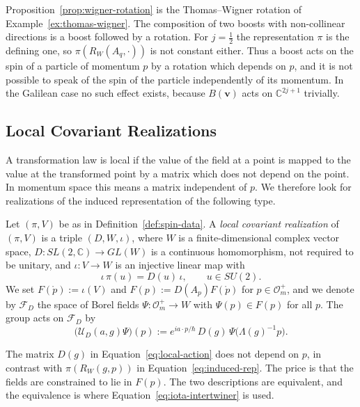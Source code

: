 	\begin{remark}
		Proposition~\ref{prop:wigner-rotation} is the Thomas--Wigner rotation of Example~\ref{ex:thomas-wigner}. The composition of two boosts with non-collinear directions is a boost followed by a rotation. For $j=\frac12$ the representation $\pi$ is the defining one, so $\pi(R_W(A_q,\cdot))$ is not constant either. Thus a boost acts on the spin of a particle of momentum $p$ by a rotation which depends on $p$, and it is not possible to speak of the spin of the particle independently of its momentum. In the Galilean case no such effect exists, because $B(\mathbf{v})$ acts on $\mathbb{C}^{2j+1}$ trivially.
	\end{remark}
	
	\subsection*{Local Covariant Realizations}
	
	A transformation law is local if the value of the field at a point is mapped to the value at the transformed point by a matrix which does not depend on the point. In momentum space this means a matrix independent of $p$. We therefore look for realizations of the induced representation of the following type.
	
	\begin{definition}\label{def:local-realization}
		Let $(\pi,V)$ be as in Definition~\ref{def:spin-data}. A \emph{local covariant realization} of $(\pi,V)$ is a triple $(D,W,\iota)$, where $W$ is a finite-dimensional complex vector space, $D:SL(2,\mathbb{C})\to GL(W)$ is a continuous homomorphism, not required to be unitary, and $\iota:V\to W$ is an injective linear map with
		\begin{equation}\label{eq:iota-intertwiner}
			\iota\,\pi(u)=D(u)\,\iota, \qquad u\in SU(2).
		\end{equation}
		We set $F(\mathring{p}):=\iota(V)$ and $F(p):=D(A_p)F(\mathring{p})$ for $p\in\mathcal{O}_m^+$, and we denote by $\mathcal{F}_D$ the space of Borel fields $\Psi:\mathcal{O}_m^+\to W$ with $\Psi(p)\in F(p)$ for all $p$. The group acts on $\mathcal{F}_D$ by
		\begin{equation}\label{eq:local-action}
			\big(\mathcal{U}_D(a,g)\Psi\big)(p):=e^{ia\cdot p/\hbar}\,D(g)\,\Psi\big(\Lambda(g)^{-1}p\big).
		\end{equation}
	\end{definition}
	
	The matrix $D(g)$ in Equation~\eqref{eq:local-action} does not depend on $p$, in contrast with $\pi(R_W(g,p))$ in Equation~\eqref{eq:induced-rep}. The price is that the fields are constrained to lie in $F(p)$. The two descriptions are equivalent, and the equivalence is where Equation~\eqref{eq:iota-intertwiner} is used.
	
